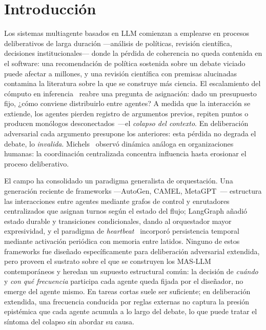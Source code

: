 \documentclass{llncs}
\begin{document}
\section{Introducci\'on}
\label{sec:intro}

Los sistemas multiagente basados en LLM comienzan a emplearse en
procesos deliberativos de larga duraci\'on ---an\'alisis de pol\'iticas,
revisi\'on cient\'ifica, decisiones institucionales--- donde la
p\'erdida de coherencia no queda contenida en el software: una
recomendaci\'on de pol\'itica sostenida sobre un debate viciado puede
afectar a millones, y una revisi\'on cient\'ifica con premisas
alucinadas contamina la literatura sobre la que se construye m\'as
ciencia. El escalamiento del c\'omputo en
inferencia~\parencite{snell2024scaling} reabre una pregunta de
asignaci\'on: dado un presupuesto fijo, ¿c\'omo conviene distribuirlo
entre agentes? A medida que la interacci\'on se extiende, los agentes
pierden registro de argumentos previos, repiten puntos o producen
mon\'ologos desconectados~\parencite{park2023generative}---el
\emph{colapso del contexto}. En deliberaci\'on adversarial cada
argumento presupone los anteriores: esta p\'erdida no degrada el
debate, lo \emph{invalida}. Michels~\parencite{michels1911political}
observ\'o din\'amica an\'aloga en organizaciones humanas: la
coordinaci\'on centralizada concentra influencia hasta erosionar el
proceso deliberativo.

El campo ha consolidado un paradigma generalista de orquestaci\'on. Una
generaci\'on reciente de frameworks ---AutoGen, CAMEL,
MetaGPT~\parencite{wu2023autogen,li2023camel,hong2023metagpt}--- estructura
las interacciones entre agentes mediante grafos de control y enrutadores
centralizados que asignan turnos seg\'un el estado del flujo;
LangGraph a\~nadi\'o estado durable y transiciones condicionales, dando al
orquestador mayor expresividad, y el paradigma de
\emph{heartbeat}~\parencite{openclaw2025heartbeat} incorpor\'o
persistencia temporal mediante activaci\'on peri\'odica con memoria entre
latidos. Ninguno de estos frameworks fue dise\~nado espec\'ificamente para
deliberaci\'on adversarial extendida, pero proveen el sustrato sobre el
que se construyen los MAS-LLM contempor\'aneos y heredan un supuesto
estructural com\'un: la decisi\'on de \emph{cu\'ando} y \emph{con qu\'e
frecuencia} participa cada agente queda fijada por el dise\~nador, no
emerge del agente mismo. En tareas cortas suele ser suficiente; en
deliberaci\'on extendida, una frecuencia conducida por reglas externas
no captura la presi\'on epist\'emica que cada agente acumula a lo largo
del debate, lo que puede tratar el s\'intoma del colapso sin abordar
su causa.
\end{document}
